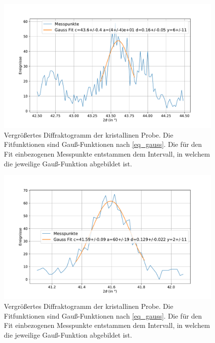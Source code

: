 \documentclass[
	a4paper,
	12pt,
	pagesize,
	ngerman
]{scrartcl}
\begin{document}
	\begin{figure}[H]
			\includegraphics[width=\linewidth]{img/XRD_Kristallin_43,5_1.pdf}
			\caption{
				Vergrößertes Diffraktogramm der kristallinen Probe.
				Die Fitfunktionen sind Gauß-Funktionen nach \cref{eq_gauss}.
				Die für den Fit einbezogenen Messpunkte entstammen dem Intervall, in welchem die jeweilige Gauß-Funktion abgebildet ist.
				}
			\label{fig_xrd_kristall_1}
	\end{figure}
	\begin{figure}[H]
			\includegraphics[width=\linewidth]{img/XRD_Kristallin_41,6_0,5.pdf}
			\caption{
				Vergrößertes Diffraktogramm der kristallinen Probe.
				Die Fitfunktionen sind Gauß-Funktionen nach \cref{eq_gauss}.
				Die für den Fit einbezogenen Messpunkte entstammen dem Intervall, in welchem die jeweilige Gauß-Funktion abgebildet ist.
				}
			\label{fig_xrd_kristall_2}
	\end{figure}
\end{document}
